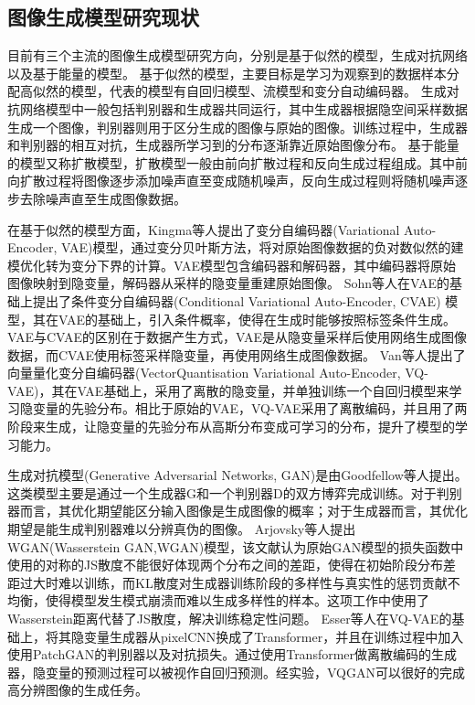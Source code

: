 \subsection{图像生成模型研究现状}
目前有三个主流的图像生成模型研究方向，分别是基于似然的模型，生成对抗网络以及基于能量的模型\cite{luoUnderstandingDiffusionModels2022}。
基于似然的模型，主要目标是学习为观察到的数据样本分配高似然的模型，代表的模型有自回归模型、流模型和变分自动编码器。
生成对抗网络模型中一般包括判别器和生成器共同运行，其中生成器根据隐空间采样数据生成一个图像，判别器则用于区分生成的图像与原始的图像。训练过程中，生成器和判别器的相互对抗，生成器所学习到的分布逐渐靠近原始图像分布。
基于能量的模型又称扩散模型，扩散模型一般由前向扩散过程和反向生成过程组成。其中前向扩散过程将图像逐步添加噪声直至变成随机噪声，反向生成过程则将随机噪声逐步去除噪声直至生成图像数据。
\par
在基于似然的模型方面，Kingma\cite{kingmaAutoEncodingVariationalBayes2022}等人提出了变分自编码器(Variational Auto-Encoder, VAE)模型，通过变分贝叶斯方法，将对原始图像数据的负对数似然的建模优化转为变分下界的计算。VAE模型包含编码器和解码器，其中编码器将原始图像映射到隐变量，解码器从采样的隐变量重建原始图像。
Sohn\cite{sohnLearningStructuredOutput2015}等人在VAE的基础上提出了条件变分自编码器(Conditional Variational Auto-Encoder, CVAE) 模型，其在VAE的基础上，引入条件概率，使得在生成时能够按照标签条件生成。VAE与CVAE的区别在于数据产生方式，VAE是从隐变量采样后使用网络生成图像数据，而CVAE使用标签采样隐变量，再使用网络生成图像数据。
Van\cite{vandenoordNeuralDiscreteRepresentation2017}等人提出了向量量化变分自编码器(VectorQuantisation Variational Auto-Encoder, VQ-VAE)，其在VAE基础上，采用了离散的隐变量，并单独训练一个自回归模型来学习隐变量的先验分布。相比于原始的VAE，VQ-VAE采用了离散编码，并且用了两阶段来生成，让隐变量的先验分布从高斯分布变成可学习的分布，提升了模型的学习能力。
\par
生成对抗模型(Generative Adversarial Networks, GAN)是由Goodfellow\cite{goodfellowGenerativeAdversarialNetworks2014}等人提出。这类模型主要是通过一个生成器G和一个判别器D的双方博弈完成训练。对于判别器而言，其优化期望能区分输入图像是生成图像的概率；对于生成器而言，其优化期望是能生成判别器难以分辨真伪的图像。
Arjovsky\cite{arjovskyWassersteinGAN2017}等人提出WGAN(Wasserstein GAN,WGAN)模型，该文献认为原始GAN模型的损失函数中使用的对称的JS散度不能很好体现两个分布之间的差距，使得在初始阶段分布差距过大时难以训练，而KL散度对生成器训练阶段的多样性与真实性的惩罚贡献不均衡，使得模型发生模式崩溃而难以生成多样性的样本。这项工作中使用了Wasserstein距离代替了JS散度，解决训练稳定性问题。
Esser\cite{esserTamingTransformersHighResolution2021}等人在VQ-VAE的基础上，将其隐变量生成器从pixelCNN换成了Transformer，并且在训练过程中加入使用PatchGAN的判别器以及对抗损失。通过使用Transformer做离散编码的生成器，隐变量的预测过程可以被视作自回归预测。经实验，VQGAN可以很好的完成高分辨图像的生成任务。

